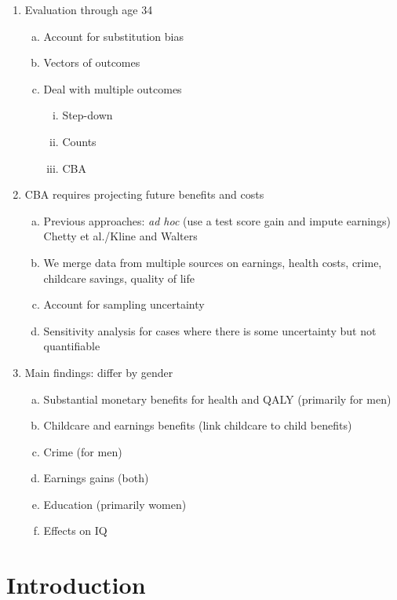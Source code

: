 \begin{enumerate}[(1)]
\begin{enumerate}[(a)]
    \end{enumerate}
\item Evaluation through age 34
    \begin{enumerate}[(a)]
    \item Account for substitution bias
    \item Vectors of outcomes
    \item Deal with multiple outcomes
        \begin{enumerate}[(i)]
        \item Step-down
        \item Counts
        \item CBA
        \end{enumerate}
    \end{enumerate}
\item CBA requires projecting future benefits and costs
    \begin{enumerate}[(a)]
    \item Previous approaches: \emph{ad hoc} (use a test score gain and impute earnings) Chetty et al./Kline and Walters
    \item We merge data from multiple sources on earnings, health costs, crime, childcare savings, quality of life
    \item Account for sampling uncertainty
    \item Sensitivity analysis for cases where there is some uncertainty but not quantifiable
    \end{enumerate}
\item Main findings: differ by gender
    \begin{enumerate}[(a)]
    \item Substantial monetary benefits for health and QALY (primarily for men)
    \item Childcare and earnings benefits (link childcare to child benefits)
    \item Crime (for men)
    \item Earnings gains (both)
    \item Education (primarily women)
    \item Effects on IQ
    \end{enumerate}
\end{enumerate}

\clearpage

\section{Introduction}

